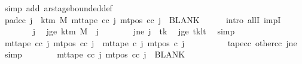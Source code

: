 \begin{isabellebody}
\ {\isacharparenleft}{\kern0pt}simp\ add{\isacharcolon}{\kern0pt}\ ar{\isacharunderscore}{\kern0pt}stage{\isacharunderscore}{\kern0pt}bounded{\isacharunderscore}{\kern0pt}def{\isacharparenright}{\kern0pt}\isanewline
\ \ \ \ \isamarkupfalse%
\ pad{\isacharunderscore}{\kern0pt}cc{\isacharcolon}{\kern0pt}\ {\isachardoublequoteopen}{\isasymforall}j{\isacharprime}{\kern0pt}\ {\isasymge}\ k{\isacharunderscore}{\kern0pt}tm\ M{\isachardot}{\kern0pt}\ mt{\isacharunderscore}{\kern0pt}tape\ cc\ j{\isacharprime}{\kern0pt}\ {\isacharparenleft}{\kern0pt}mt{\isacharunderscore}{\kern0pt}pos\ cc\ j{\isacharprime}{\kern0pt}{\isacharparenright}{\kern0pt}\ {\isacharequal}{\kern0pt}\ BLANK{}{\isachardoublequoteclose}\isanewline
\ \ \ \ \isamarkupfalse%
\ {\isacharparenleft}{\kern0pt}intro\ allI\ impI{\isacharparenright}{\kern0pt}\isanewline
\ \ \ \ \ \ \isamarkupfalse%
\ j{\isacharprime}{\kern0pt}\ \isamarkupfalse%
\ jge{\isacharcolon}{\kern0pt}\ {\isachardoublequoteopen}k{\isacharunderscore}{\kern0pt}tm\ M\ {\isasymle}\ j{\isacharprime}{\kern0pt}{\isachardoublequoteclose}\isanewline
\ \ \ \ \ \ \isamarkupfalse%
\ jne{\isacharcolon}{\kern0pt}\ {\isachardoublequoteopen}j{\isacharprime}{\kern0pt}\ {\isasymnoteq}\ tk{\isachardoublequoteclose}\ \isamarkupfalse%
\ jge\ tk{\isacharunderscore}{\kern0pt}lt\ \isamarkupfalse%
\ simp\isanewline
\ \ \ \ \ \ \isamarkupfalse%
\ {\isachardoublequoteopen}mt{\isacharunderscore}{\kern0pt}tape\ cc\ j{\isacharprime}{\kern0pt}\ {\isacharparenleft}{\kern0pt}mt{\isacharunderscore}{\kern0pt}pos\ cc\ j{\isacharprime}{\kern0pt}{\isacharparenright}{\kern0pt}\ {\isacharequal}{\kern0pt}\ mt{\isacharunderscore}{\kern0pt}tape\ c{}\ j{\isacharprime}{\kern0pt}\ {\isacharparenleft}{\kern0pt}mt{\isacharunderscore}{\kern0pt}pos\ c{}\ j{\isacharprime}{\kern0pt}{\isacharparenright}{\kern0pt}{\isachardoublequoteclose}\isanewline
\ \ \ \ \ \ \ \ \isamarkupfalse%
\ tape{\isacharunderscore}{\kern0pt}cc\ other{\isacharunderscore}{\kern0pt}cc\ jne\ \isamarkupfalse%
\ simp\isanewline
\ \ \ \ \ \ \isamarkupfalse%
\ {\isachardoublequoteopen}mt{\isacharunderscore}{\kern0pt}tape\ cc\ j{\isacharprime}{\kern0pt}\ {\isacharparenleft}{\kern0pt}mt{\isacharunderscore}{\kern0pt}pos\ cc\ j{\isacharprime}{\kern0pt}{\isacharparenright}{\kern0pt}\ {\isacharequal}{\kern0pt}\ BLANK{}{\isachardoublequoteclose}\ \isamarkupfalse%

\end{isabellebody}
